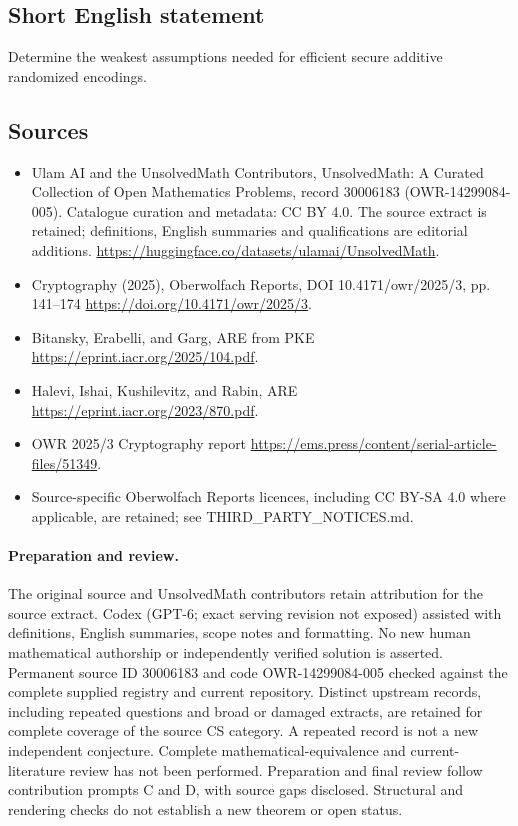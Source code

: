 \documentclass[11pt]{article}
\begin{document}
\subsection{Short English statement}
Determine the weakest assumptions needed for efficient secure additive randomized encodings.
\subsection{Sources}
\begin{itemize}
\item[\hypertarget{source:30006183:1}{S1}] Ulam AI and the UnsolvedMath Contributors, UnsolvedMath: A Curated Collection of Open Mathematics Problems, record 30006183 (OWR-14299084-005). Catalogue curation and metadata: CC BY 4.0. The source extract is retained; definitions, English summaries and qualifications are editorial additions.
\url{https://huggingface.co/datasets/ulamai/UnsolvedMath}.
\item[\hypertarget{source:30006183:2}{S2}] Cryptography (2025), Oberwolfach Reports, DOI 10.4171/owr/2025/3, pp. 141--174
\url{https://doi.org/10.4171/owr/2025/3}.
\item[\hypertarget{source:30006183:3}{S3}] Bitansky, Erabelli, and Garg, ARE from PKE
\url{https://eprint.iacr.org/2025/104.pdf}.
\item[\hypertarget{source:30006183:4}{S4}] Halevi, Ishai, Kushilevitz, and Rabin, ARE
\url{https://eprint.iacr.org/2023/870.pdf}.
\item[\hypertarget{source:30006183:5}{S5}] OWR 2025/3 Cryptography report
\url{https://ems.press/content/serial-article-files/51349}.
\item Source-specific Oberwolfach Reports licences, including CC BY-SA 4.0 where applicable, are retained; see THIRD\_PARTY\_NOTICES.md.
\end{itemize}
\paragraph{Preparation and review.}
The original source and UnsolvedMath contributors retain attribution for the source extract. Codex (GPT-6; exact serving revision not exposed) assisted with definitions, English summaries, scope notes and formatting. No new human mathematical authorship or independently verified solution is asserted. Permanent source ID 30006183 and code OWR-14299084-005 checked against the complete supplied registry and current repository. Distinct upstream records, including repeated questions and broad or damaged extracts, are retained for complete coverage of the source CS category. A repeated record is not a new independent conjecture. Complete mathematical-equivalence and current-literature review has not been performed. Preparation and final review follow contribution prompts C and D, with source gaps disclosed. Structural and rendering checks do not establish a new theorem or open status.
\label{end:30006183}
\end{document}
